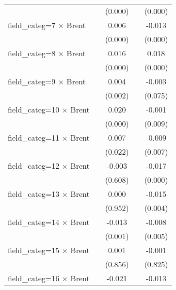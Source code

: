 \begin{tabular}{l*{4}{c}}
                                        &            &     (0.000)&            &     (0.000)\\
field_categ=7 $\times$ Brent            &            &       0.006&            &      -0.013\\
                                        &            &     (0.000)&            &     (0.000)\\
field_categ=8 $\times$ Brent            &            &       0.016&            &       0.018\\
                                        &            &     (0.000)&            &     (0.000)\\
field_categ=9 $\times$ Brent            &            &       0.004&            &      -0.003\\
                                        &            &     (0.002)&            &     (0.075)\\
field_categ=10 $\times$ Brent           &            &       0.020&            &      -0.001\\
                                        &            &     (0.000)&            &     (0.009)\\
field_categ=11 $\times$ Brent           &            &       0.007&            &      -0.009\\
                                        &            &     (0.022)&            &     (0.007)\\
field_categ=12 $\times$ Brent           &            &      -0.003&            &      -0.017\\
                                        &            &     (0.608)&            &     (0.000)\\
field_categ=13 $\times$ Brent           &            &       0.000&            &      -0.015\\
                                        &            &     (0.952)&            &     (0.004)\\
field_categ=14 $\times$ Brent           &            &      -0.013&            &      -0.008\\
                                        &            &     (0.001)&            &     (0.005)\\
field_categ=15 $\times$ Brent           &            &       0.001&            &      -0.001\\
                                        &            &     (0.856)&            &     (0.825)\\
field_categ=16 $\times$ Brent           &            &      -0.021&            &      -0.013\\

\end{tabular}
